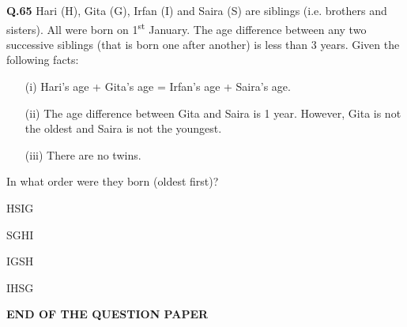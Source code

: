 \documentclass[journal,12pt,onecolumn]{IEEEtran}
\theoremstyle{remark}
\begin{document}
\begin{enumerate}
    \noindent\textbf{Q.65} Hari (H), Gita (G), Irfan (I) and Saira (S) are siblings (i.e. brothers and sisters). All were born on 1\textsuperscript{st} January. The age difference between any two successive siblings (that is born one after another) is less than 3 years. Given the following facts:
    \begin{itemize}
    \item[(i)]  Hari's age + Gita's age = Irfan's age + Saira's age.
    \item[(ii)] The age difference between Gita and Saira is 1 year. However, Gita is not the oldest and Saira is not the youngest.
    \item[(iii)] There are no twins.
    \end{itemize}
     In what order were they born (oldest first)?
     \hfill{}
     \begin{enumerate}[label=(\Alph*)]
     \begin{multicols}{4}
     \item HSIG
     \item SGHI
     \item IGSH
     \item IHSG
     \end{multicols}
     \end{enumerate}

     \vspace{1cm}
     \begin{center}
     \textbf{END OF THE QUESTION PAPER}
     \end{center}
     

    
    \end{enumerate}
    
\end{document}
